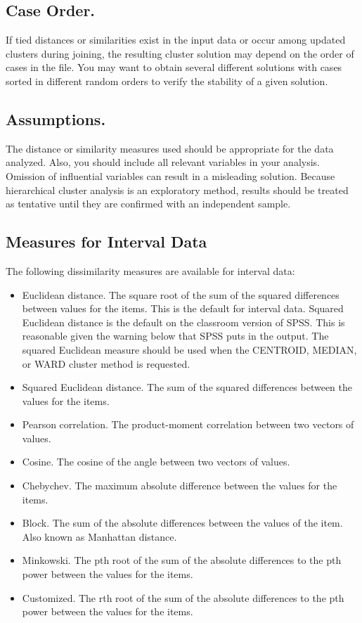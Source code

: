 \documentclass[a4paper,12pt]{article}
\begin{document}
\subsection*{Case Order.} If tied distances or similarities exist in the input data or occur among updated clusters during joining, the resulting cluster solution may depend on the order of cases in the file. You may want to obtain several different solutions with cases sorted in different random orders to verify the stability of a given solution.
\subsection*{Assumptions.}  The distance or similarity measures used should be appropriate for the data analyzed. Also, you should include all relevant variables in your analysis. Omission of influential variables can result in a misleading solution. Because hierarchical cluster analysis is an exploratory method, results should be treated as tentative until they are confirmed with an independent sample.

 
\subsection*{Measures for Interval Data}
The following dissimilarity measures are available for interval data:
\begin{itemize}

\item Euclidean distance. The square root of the sum of the squared differences between values for the items. This is the default for interval data. {Squared Euclidean distance is the default on the classroom version of SPSS.  This is reasonable given the warning below that SPSS puts in the output.} 
The squared Euclidean measure should be used when the CENTROID, MEDIAN, or WARD cluster method is requested.
\item 	Squared Euclidean distance. The sum of the squared differences between the values for the items. 
\item 	Pearson correlation. The product-moment correlation between two vectors of values. 
\item 	Cosine. The cosine of the angle between two vectors of values. 
\item 	Chebychev. The maximum absolute difference between the values for the items. 
\item 	Block. The sum of the absolute differences between the values of the item. Also known as Manhattan distance. 
\item 	Minkowski. The pth root of the sum of the absolute differences to the pth power between the values for the items. 
\item 	Customized. The rth root of the sum of the absolute differences to the pth power between the values for the items.
\end{itemize}
\newpage
\end{document}
